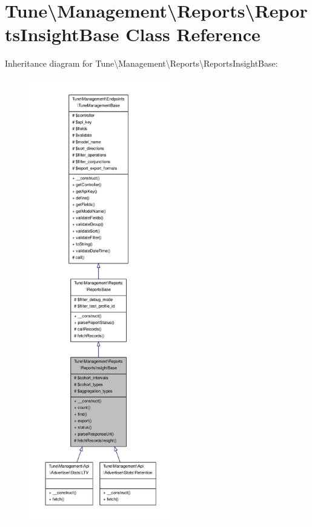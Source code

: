 \hypertarget{classTune_1_1Management_1_1Reports_1_1ReportsInsightBase}{\section{Tune\textbackslash{}Management\textbackslash{}Reports\textbackslash{}Reports\-Insight\-Base Class Reference}
\label{classTune_1_1Management_1_1Reports_1_1ReportsInsightBase}
}


Inheritance diagram for Tune\textbackslash{}Management\textbackslash{}Reports\textbackslash{}Reports\-Insight\-Base\-:
\nopagebreak
\begin{figure}[H]
\begin{center}
\leavevmode
\includegraphics[height=550pt]{classTune_1_1Management_1_1Reports_1_1ReportsInsightBase__inherit__graph}
\end{center}
\end{figure}


